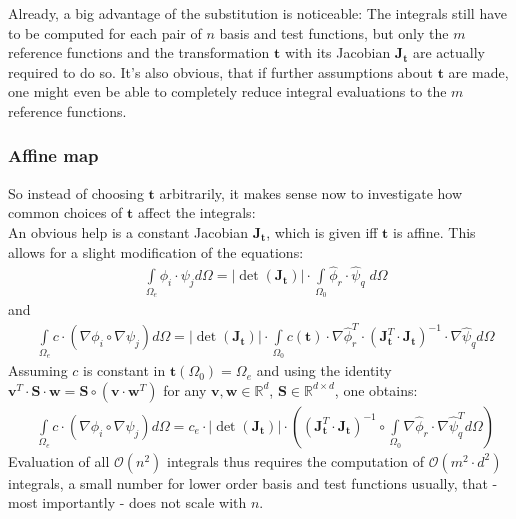 \documentclass{IOS-Book-Article}
\theoremstyle{plain}
\theoremstyle{definition}
\begin{document}
Already, a big advantage of the substitution is noticeable: The integrals still have to be computed for each pair of $n$ basis and test functions, but only the $m$ reference functions and the transformation $\mathbf t$ with its Jacobian $\mathbf J_{\mathbf t}$ are actually required to do so. It's also obvious, that if further assumptions about $\mathbf t$ are made, one might even be able to completely reduce integral evaluations to the $m$ reference functions.

\subsubsection{Affine map}

So instead of choosing $\mathbf t$ arbitrarily, it makes sense now to investigate how common choices of $\mathbf t$ affect the integrals: \\
An obvious help is a constant Jacobian $\mathbf J_{\mathbf t}$, which is given iff $\mathbf t$ is affine. 
This allows for a slight modification of the equations:
\begin{align*}
	& \int \limits_{\Omega_e} \phi_i \cdot \psi_j d\Omega = \left| \det(\mathbf J_{\mathbf t}) \right| \cdot \int \limits_{\Omega_0} \hat \phi_r \cdot \hat \psi_q \; d\Omega
\end{align*}
and
\begin{align*}
	& \int \limits_{\Omega_e} c \cdot (\nabla \phi_i \circ \nabla \psi_j) d\Omega = \left| \det(\mathbf J_{\mathbf t}) \right| \cdot \int \limits_{\Omega_0} c( \mathbf t ) \cdot \nabla \hat \phi_r^T \cdot (\mathbf J_{\mathbf{t}}^T \cdot \mathbf J_{\mathbf{t}})^{-1} \cdot \nabla \hat \psi_q d\Omega
\end{align*}
Assuming $c$ is constant in $\mathbf t(\Omega_0) = \Omega_e$ and using the identity $\mathbf v^T \cdot \mathbf S \cdot \mathbf w = \mathbf S \circ (\mathbf v \cdot \mathbf w^T)$ for any $\mathbf v, \mathbf w \in \mathbb R^d$, $\mathbf S \in \mathbb R^{d \times d}$, one obtains:
\begin{align*}
	& \int \limits_{\Omega_e} c \cdot (\nabla \phi_i \circ \nabla \psi_j) d\Omega = c_e \cdot \left| \det(\mathbf J_{\mathbf t}) \right| \cdot \left( (\mathbf J_{\mathbf{t}}^T \cdot \mathbf J_{\mathbf{t}})^{-1} \circ \int \limits_{\Omega_0} \nabla \hat \phi_r \cdot \nabla \hat \psi_q^T d\Omega \right)
\end{align*}
Evaluation of all $\mathcal O(n^2)$ integrals thus requires the computation of $\mathcal O(m^2 \cdot d^2)$ integrals, a small number for lower order basis and test functions usually, that - most importantly - does not scale with $n$.
\end{document}
